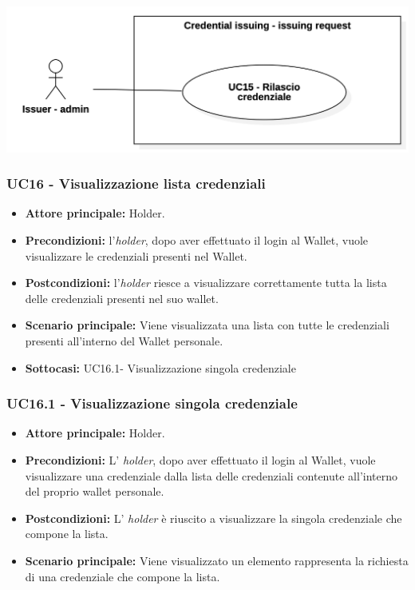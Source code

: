 \begin{center}
    \includegraphics[scale = 0.3]{./res/img/2Credential_issuing_4.png}
  \end{center}



\subsubsection{UC16 - Visualizzazione lista credenziali}
\begin{itemize}
    \item \textbf{Attore principale:} Holder.
    \item \textbf{Precondizioni:} l'\textit{holder}, dopo aver effettuato il login al Wallet, vuole visualizzare le credenziali presenti nel Wallet. 
    \item \textbf{Postcondizioni:} l'\textit{holder} riesce a visualizzare correttamente tutta la lista delle credenziali presenti nel suo wallet. 
    \item \textbf{Scenario principale:} Viene visualizzata una lista con tutte le credenziali presenti all'interno del Wallet personale. 
    \item \textbf{Sottocasi:} UC16.1- Visualizzazione singola credenziale
\end{itemize}


\subsubsection{UC16.1 - Visualizzazione singola credenziale}
\begin{itemize}
\item \textbf{Attore principale:} Holder.
\item \textbf{Precondizioni:} L’ \textit{holder}, dopo aver effettuato il login al Wallet, vuole visualizzare una credenziale dalla lista delle credenziali contenute all'interno del proprio wallet personale. 
\item \textbf{Postcondizioni:} L’ \textit{holder} è riuscito a visualizzare la singola credenziale che compone la lista.
\item \textbf{Scenario principale:} Viene visualizzato un elemento rappresenta la richiesta di una credenziale che compone la lista.
\end{itemize}

